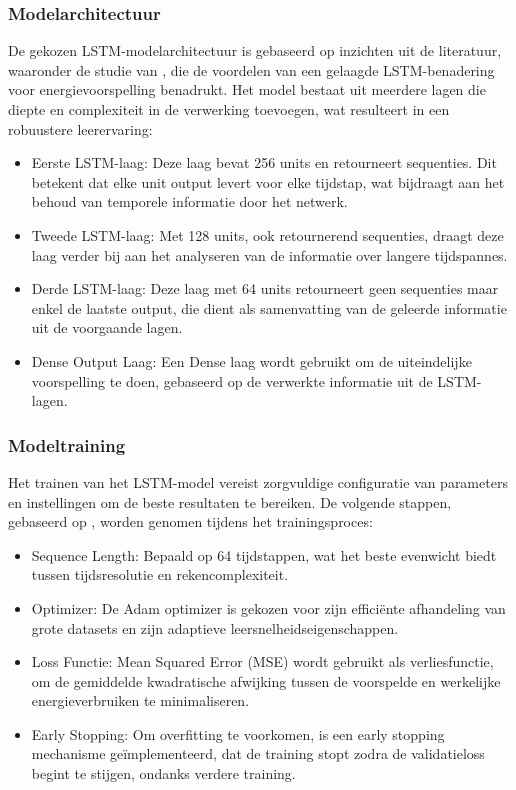 \subsubsection{Modelarchitectuur}
De gekozen LSTM-modelarchitectuur is gebaseerd op inzichten uit de literatuur, waaronder de studie van \textcite{Wang_2020}, die de voordelen van een gelaagde LSTM-benadering voor energievoorspelling benadrukt. Het model bestaat uit meerdere lagen die diepte en complexiteit in de verwerking toevoegen, wat resulteert in een robuustere leerervaring:
\begin{itemize}
    \item Eerste LSTM-laag: Deze laag bevat 256 units en retourneert sequenties. Dit betekent dat elke unit output levert voor elke tijdstap, wat bijdraagt aan het behoud van temporele informatie door het netwerk.
    \item Tweede LSTM-laag: Met 128 units, ook retournerend sequenties, draagt deze laag verder bij aan het analyseren van de informatie over langere tijdspannes.
    \item Derde LSTM-laag: Deze laag met 64 units retourneert geen sequenties maar enkel de laatste output, die dient als samenvatting van de geleerde informatie uit de voorgaande lagen.
    \item Dense Output Laag: Een Dense laag wordt gebruikt om de uiteindelijke voorspelling te doen, gebaseerd op de verwerkte informatie uit de LSTM-lagen.
\end{itemize}

\subsubsection{Modeltraining}
Het trainen van het LSTM-model vereist zorgvuldige configuratie van parameters en instellingen om de beste resultaten te bereiken. De volgende stappen, gebaseerd op \textcite{Wang_2020}, worden genomen tijdens het trainingsproces:
\begin{itemize}
    \item Sequence Length: Bepaald op 64 tijdstappen, wat het beste evenwicht biedt tussen tijdsresolutie en rekencomplexiteit.
    \item Optimizer: De Adam optimizer is gekozen voor zijn efficiënte afhandeling van grote datasets en zijn adaptieve leersnelheidseigenschappen.
    \item Loss Functie: Mean Squared Error (MSE) wordt gebruikt als verliesfunctie, om de gemiddelde kwadratische afwijking tussen de voorspelde en werkelijke energieverbruiken te minimaliseren.
    \item Early Stopping: Om overfitting te voorkomen, is een early stopping mechanisme geïmplementeerd, dat de training stopt zodra de validatieloss begint te stijgen, ondanks verdere training.
\end{itemize}

